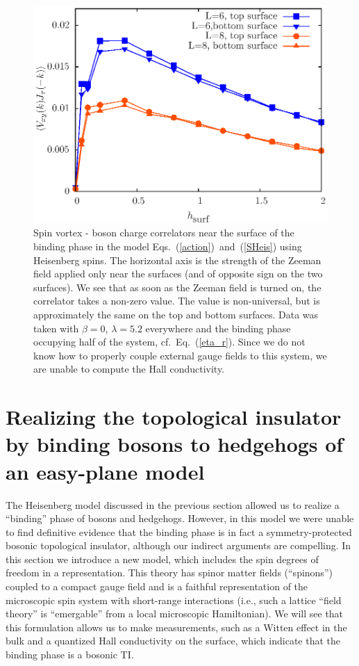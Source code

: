 \begin{figure}
\includegraphics[width=\linewidth]{figures/vortexcor.eps}
\caption{Spin vortex - boson charge correlators near the surface of the binding phase in the model Eqs.~(\ref{action})~and~(\ref{SHeis}) using Heisenberg spins. The horizontal axis is the strength of the Zeeman field applied only near the surfaces (and of opposite sign on the two surfaces). We see that as soon as the Zeeman field is turned on, the correlator takes a non-zero value. The value is non-universal, but is approximately the same on the top and bottom surfaces. Data was taken with $\beta=0$, $\lambda=5.2$ everywhere and the binding phase occupying half of the system, cf.\ Eq.~(\ref{eta_r}).  Since we do not know how to properly couple external gauge fields to this system, we are unable to compute the Hall conductivity.
}
\label{heishall}
\end{figure}




\section{Realizing the topological insulator by binding bosons to hedgehogs of an easy-plane \cp model}
\label{section::CP1}

The Heisenberg model discussed in the previous section allowed us to realize a ``binding'' phase of bosons and hedgehogs. However, in this model we were unable to find definitive evidence that the binding phase is in fact a symmetry-protected bosonic topological insulator, although our indirect arguments are compelling. In this section we introduce a new model, which includes the spin degrees of freedom in a \cp representation. 
This theory has spinor matter fields (``spinons'') coupled to a compact gauge field and is a faithful representation of the microscopic spin system with short-range interactions (i.e., such a lattice ``field theory'' is ``emergable'' from a local microscopic Hamiltonian). We will see that this formulation allows us to make measurements, such as a Witten effect in the bulk and a quantized Hall conductivity on the surface, which indicate that the binding phase is a bosonic TI.

